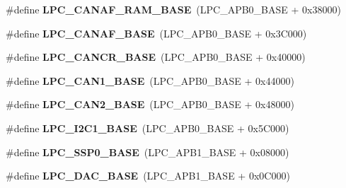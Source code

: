 \begin{DoxyCompactItemize}
\item 
\hypertarget{group___l_p_c17xx___system_ga9d4f2bac61e26b32ad64d62f2be50e49}{\#define {\bfseries \-L\-P\-C\-\_\-\-C\-A\-N\-A\-F\-\_\-\-R\-A\-M\-\_\-\-B\-A\-S\-E}~(\-L\-P\-C\-\_\-\-A\-P\-B0\-\_\-\-B\-A\-S\-E + 0x38000)}\label{group___l_p_c17xx___system_ga9d4f2bac61e26b32ad64d62f2be50e49}

\item 
\hypertarget{group___l_p_c17xx___system_gabc6943f9e943d63ecf4e236b4ce7c344}{\#define {\bfseries \-L\-P\-C\-\_\-\-C\-A\-N\-A\-F\-\_\-\-B\-A\-S\-E}~(\-L\-P\-C\-\_\-\-A\-P\-B0\-\_\-\-B\-A\-S\-E + 0x3\-C000)}\label{group___l_p_c17xx___system_gabc6943f9e943d63ecf4e236b4ce7c344}

\item 
\hypertarget{group___l_p_c17xx___system_gac22b88e108d620661add143c174f8f11}{\#define {\bfseries \-L\-P\-C\-\_\-\-C\-A\-N\-C\-R\-\_\-\-B\-A\-S\-E}~(\-L\-P\-C\-\_\-\-A\-P\-B0\-\_\-\-B\-A\-S\-E + 0x40000)}\label{group___l_p_c17xx___system_gac22b88e108d620661add143c174f8f11}

\item 
\hypertarget{group___l_p_c17xx___system_gaf2407c1927ebddd767832aefa74c3398}{\#define {\bfseries \-L\-P\-C\-\_\-\-C\-A\-N1\-\_\-\-B\-A\-S\-E}~(\-L\-P\-C\-\_\-\-A\-P\-B0\-\_\-\-B\-A\-S\-E + 0x44000)}\label{group___l_p_c17xx___system_gaf2407c1927ebddd767832aefa74c3398}

\item 
\hypertarget{group___l_p_c17xx___system_gab9608b3b72dd843a25910dd2a809106b}{\#define {\bfseries \-L\-P\-C\-\_\-\-C\-A\-N2\-\_\-\-B\-A\-S\-E}~(\-L\-P\-C\-\_\-\-A\-P\-B0\-\_\-\-B\-A\-S\-E + 0x48000)}\label{group___l_p_c17xx___system_gab9608b3b72dd843a25910dd2a809106b}

\item 
\hypertarget{group___l_p_c17xx___system_gae59f73cf24ff126be3b9a8b921926676}{\#define {\bfseries \-L\-P\-C\-\_\-\-I2\-C1\-\_\-\-B\-A\-S\-E}~(\-L\-P\-C\-\_\-\-A\-P\-B0\-\_\-\-B\-A\-S\-E + 0x5\-C000)}\label{group___l_p_c17xx___system_gae59f73cf24ff126be3b9a8b921926676}

\item 
\hypertarget{group___l_p_c17xx___system_ga53fb1af80b541545988f2a966681abfd}{\#define {\bfseries \-L\-P\-C\-\_\-\-S\-S\-P0\-\_\-\-B\-A\-S\-E}~(\-L\-P\-C\-\_\-\-A\-P\-B1\-\_\-\-B\-A\-S\-E + 0x08000)}\label{group___l_p_c17xx___system_ga53fb1af80b541545988f2a966681abfd}

\item 
\hypertarget{group___l_p_c17xx___system_ga3bbaedad584252212d4704bb419489f6}{\#define {\bfseries \-L\-P\-C\-\_\-\-D\-A\-C\-\_\-\-B\-A\-S\-E}~(\-L\-P\-C\-\_\-\-A\-P\-B1\-\_\-\-B\-A\-S\-E + 0x0\-C000)}\label{group___l_p_c17xx___system_ga3bbaedad584252212d4704bb419489f6}


\end{DoxyCompactItemize}
